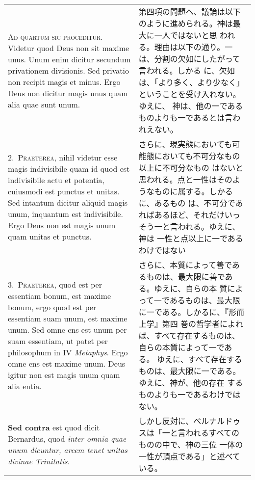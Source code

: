 \documentclass[10pt]{jsarticle} %
\begin{document}
\begin{longtable}{p{21em}p{21em}}
{\huge A}{\scshape d quartum sic proceditur}. Videtur quod Deus non sit
 maxime unus. Unum enim dicitur secundum privationem divisionis. Sed
 privatio non recipit magis et minus. Ergo Deus non dicitur magis unus
 quam alia quae sunt unum.

&

第四項の問題へ、議論は以下のように進められる。神は最大に一人ではないと思
われる。理由は以下の通り。一は、分割の欠如にしたがって言われる。しかる
に、欠如は、「より多く、より少なく」ということを受け入れない。ゆえに、
神は、他の一であるものよりも一であるとは言われえない。

\\

2.~{\scshape Praeterea}, nihil videtur esse magis indivisibile quam id quod est
indivisibile actu et potentia, cuiusmodi est punctus et unitas. Sed
intantum dicitur aliquid magis unum, inquantum est indivisibile. Ergo
Deus non est magis unum quam unitas et punctus.

&

さらに、現実態においても可能態においても不可分なもの以上に不可分なもの
はないと思われる。点と一性はそのようなものに属する。しかるに、あるもの
は、不可分であればあるほど、それだけいっそう一と言われる。ゆえに、神は
一性と点以上に一であるわけではない

\\

3.~{\scshape Praeterea}, quod est per essentiam bonum, est maxime bonum, ergo quod
est per essentiam suam unum, est maxime unum. Sed omne ens est unum per
suam essentiam, ut patet per philosophum in IV {\it Metaphys}. Ergo omne ens
est maxime unum. Deus igitur non est magis unum quam alia entia.

&

さらに、本質によって善であるものは、最大限に善である。ゆえに、自らの本
質によって一であるものは、最大限に一である。しかるに、『形而上学』第四
巻の哲学者によれば、すべて存在するものは、自らの本質によって一である。
ゆえに、すべて存在するものは、最大限に一である。ゆえに、神が、他の存在
するものよりも一であるわけではない。

\\

{\bf Sed contra} est quod dicit Bernardus, quod {\itshape inter omnia quae unum
 dicuntur, arcem tenet unitas divinae Trinitatis}.

&

しかし反対に、ベルナルドゥスは「一と言われるすべてのものの中で、神の三位
一体の一性が頂点である」と述べている。


\end{longtable}
\end{document}
